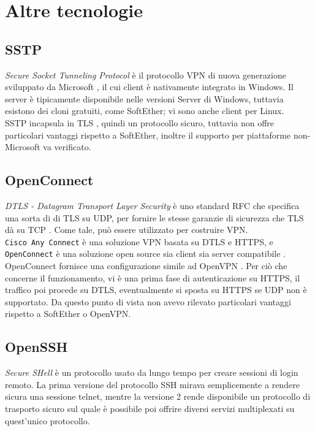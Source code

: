 \section{Altre tecnologie}
\subsection{SSTP}
\textit{Secure Socket Tunneling Protocol} è il protocollo VPN di nuova generazione sviluppato
da Microsoft \cite{sstp}, il cui client è nativamente integrato in Windows. Il server è tipicamente
disponibile nelle versioni Server di Windows, tuttavia esistono dei cloni gratuiti, come
SoftEther; vi sono anche client per Linux.\\
SSTP incapsula in TLS , quindi un protocollo
sicuro, tuttavia non offre particolari vantaggi rispetto a SoftEther, inoltre il supporto
per piattaforme non-Microsoft va verificato.

\subsection{OpenConnect}
\textit{DTLS - Datagram Transport Layer Security} è uno standard RFC che specifica
una sorta di di TLS su UDP, per fornire le stesse garanzie di sicurezza che TLS dà
su TCP \cite{RFC6347}. Come tale, può essere utilizzato per costruire VPN.\\
\texttt{Cisco Any Connect} è una soluzione VPN basata su DTLS e HTTPS, e
\texttt{OpenConnect} è una soluzione open source sia client sia server compatibile
\cite{cisco-vpn} \cite{openconnect-client} \cite{openconnect-server}.
OpenConnect fornisce una configurazione simile ad OpenVPN \cite{openconnect-server-conf}.
Per ciò che concerne il funzionamento, vi è una prima fase di
autenticazione su HTTPS, il traffico poi procede su DTLS, eventualmente si sposta su
HTTPS se UDP non è supportato. Da questo punto di vista non avevo rilevato particolari
vantaggi rispetto a SoftEther o OpenVPN.


\subsection{OpenSSH}
\textit{Secure SHell} è un protocollo usato da lungo tempo per creare sessioni di login remoto.
La prima versione del protocollo SSH mirava semplicemente a rendere sicura una
sessione telnet, mentre la versione 2 rende disponibile un protocollo di trasporto
sicuro sul quale è possibile poi offrire diversi servizi multiplexati su quest'unico
protocollo.

